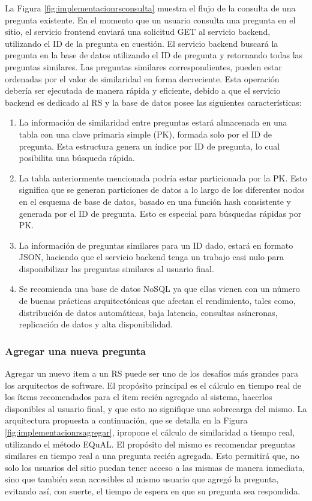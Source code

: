 La Figura \ref{fig:implementacionrsconsulta} muestra el flujo de la consulta de una pregunta existente. En el momento que un usuario consulta una pregunta en el sitio, el servicio frontend enviará una solicitud GET al servicio backend, utilizando el ID de la pregunta en cuestión. El servicio backend buscará la pregunta en la base de datos utilizando el ID de pregunta y retornando todas las preguntas similares. Las preguntas similares correspondientes, pueden estar ordenadas por el valor de similaridad en forma decreciente. Esta operación debería ser ejecutada de manera rápida y eficiente, debido a que el servicio backend es dedicado al RS y la base de datos posee las siguientes características:
\begin{enumerate}
	\item La información de similaridad entre preguntas estará almacenada en una tabla con una clave primaria simple (PK), formada solo por el ID de pregunta. Esta estructura genera un índice por ID de pregunta, lo cual posibilita una búsqueda rápida.
	\item La tabla anteriormente mencionada podría estar particionada por la PK. Esto significa que se generan particiones de datos a lo largo de los diferentes nodos en el esquema de base de datos, basado en una función hash consistente y generada por el ID de pregunta. Esto es especial para búsquedas rápidas por PK.
	\item La información de preguntas similares para un ID dado, estará en formato JSON, haciendo que el servicio backend tenga un trabajo casi nulo para disponibilizar las preguntas similares al usuario final.
	\item Se recomienda una base de datos NoSQL ya que ellas vienen con un número de buenas prácticas arquitectónicas que afectan el rendimiento, tales como, distribución de datos automáticas, baja latencia, consultas asíncronas, replicación de datos y alta disponibilidad.
\end{enumerate}

\subsubsection{Agregar una nueva pregunta}
Agregar un nuevo item a un RS puede ser uno de los desafíos más grandes para los arquitectos de software. El propósito principal es el cálculo en tiempo real de los ítems recomendados para el ítem recién agregado al sistema, hacerlos disponibles al usuario final, y que esto no signifique una sobrecarga del mismo. La arquitectura propuesta a continuación, que se detalla en la Figura \ref{fig:implementacionrsagregar}, ipropone el cálculo de similaridad a tiempo real, utilizando el método EQuAL. El propósito del mismo es recomendar preguntas similares en tiempo real a una pregunta recién agregada. Esto permitirá que, no solo los usuarios del sitio puedan tener acceso a las mismas de manera inmediata, sino que también sean accesibles al mismo usuario que agregó la pregunta, evitando así, con suerte, el tiempo de espera en que su pregunta sea respondida.

